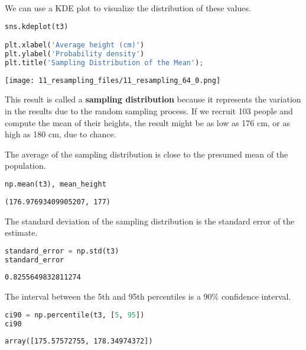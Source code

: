 We can use a KDE plot to visualize the distribution of these values.

\begin{lstlisting}[language=Python,style=source]
sns.kdeplot(t3)

plt.xlabel('Average height (cm)')
plt.ylabel('Probability density')
plt.title('Sampling Distribution of the Mean');
\end{lstlisting}

\begin{center}
\texttt{[image: 11\_resampling\_files/11\_resampling\_64\_0.png]}
\end{center}

This result is called a \textbf{sampling distribution} because it
represents the variation in the results due to the random sampling
process. If we recruit 103 people and compute the mean of their heights,
the result might be as low as 176 cm, or as high as 180 cm, due to
chance.

The average of the sampling distribution is close to the presumed mean
of the population.

\begin{lstlisting}[language=Python,style=source]
np.mean(t3), mean_height
\end{lstlisting}

\begin{lstlisting}[style=output]
(176.97693409905207, 177)
\end{lstlisting}

The standard deviation of the sampling distribution is the standard
error of the estimate.

\begin{lstlisting}[language=Python,style=source]
standard_error = np.std(t3)
standard_error
\end{lstlisting}

\begin{lstlisting}[style=output]
0.8255649832811274
\end{lstlisting}

The interval between the 5th and 95th percentiles is a 90\% confidence
interval.

\begin{lstlisting}[language=Python,style=source]
ci90 = np.percentile(t3, [5, 95])
ci90
\end{lstlisting}

\begin{lstlisting}[style=output]
array([175.57572755, 178.34974372])
\end{lstlisting}


